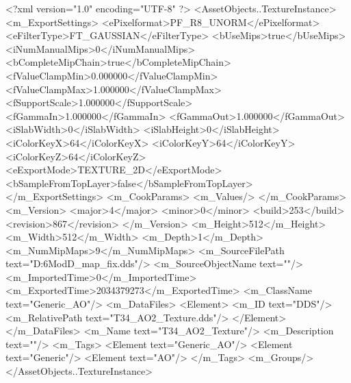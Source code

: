 <?xml version="1.0" encoding="UTF-8" ?>
<AssetObjects..TextureInstance>
	<m_ExportSettings>
		<ePixelformat>PF_R8_UNORM</ePixelformat>
		<eFilterType>FT_GAUSSIAN</eFilterType>
		<bUseMips>true</bUseMips>
		<iNumManualMips>0</iNumManualMips>
		<bCompleteMipChain>true</bCompleteMipChain>
		<fValueClampMin>0.000000</fValueClampMin>
		<fValueClampMax>1.000000</fValueClampMax>
		<fSupportScale>1.000000</fSupportScale>
		<fGammaIn>1.000000</fGammaIn>
		<fGammaOut>1.000000</fGammaOut>
		<iSlabWidth>0</iSlabWidth>
		<iSlabHeight>0</iSlabHeight>
		<iColorKeyX>64</iColorKeyX>
		<iColorKeyY>64</iColorKeyY>
		<iColorKeyZ>64</iColorKeyZ>
		<eExportMode>TEXTURE_2D</eExportMode>
		<bSampleFromTopLayer>false</bSampleFromTopLayer>
	</m_ExportSettings>
	<m_CookParams>
		<m_Values/>
	</m_CookParams>
	<m_Version>
		<major>4</major>
		<minor>0</minor>
		<build>253</build>
		<revision>867</revision>
	</m_Version>
	<m_Height>512</m_Height>
	<m_Width>512</m_Width>
	<m_Depth>1</m_Depth>
	<m_NumMipMaps>9</m_NumMipMaps>
	<m_SourceFilePath text="D:\Civ6Mod\3D\ao_map_fix.dds"/>
	<m_SourceObjectName text=""/>
	<m_ImportedTime>0</m_ImportedTime>
	<m_ExportedTime>2034379273</m_ExportedTime>
	<m_ClassName text="Generic_AO"/>
	<m_DataFiles>
		<Element>
			<m_ID text="DDS"/>
			<m_RelativePath text="T34_AO2_Texture.dds"/>
		</Element>
	</m_DataFiles>
	<m_Name text="T34_AO2_Texture"/>
	<m_Description text=""/>
	<m_Tags>
		<Element text="Generic_AO"/>
		<Element text="Generic"/>
		<Element text="AO"/>
	</m_Tags>
	<m_Groups/>
</AssetObjects..TextureInstance>

 